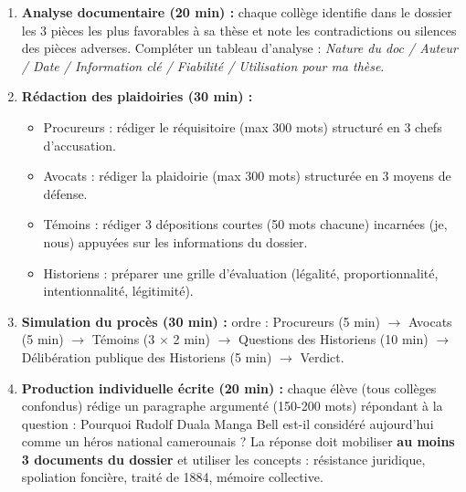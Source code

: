 \documentclass[11pt]{article}
\newcommand{\cle}[1]{{\popxbold\color{popdark}#1}}
\newcounter{popsec}
\newcounter{popsub}
\newcommand{\courssub}[1]{%
  \stepcounter{popsub}%
  \par\vspace{9pt}\noindent{\popxbold\fontsize{11.5}{13}\selectfont\color{popink}{\color{poporange}\thepopsec.\thepopsub}\hspace{6pt}#1}\par\nopagebreak\vspace{4pt}
}
\begin{document}
\courssub{Consignes}
\begin{enumerate}
    \item \textbf{Analyse documentaire (20 min) :} chaque collège identifie dans le dossier les 3 pièces les plus favorables à sa thèse et note les contradictions ou silences des pièces adverses. Compléter un tableau d'analyse : \emph{Nature du doc / Auteur / Date / Information clé / Fiabilité / Utilisation pour ma thèse}.
    \item \textbf{Rédaction des plaidoiries (30 min) :}
    \begin{itemize}
        \item Procureurs : rédiger le réquisitoire (max 300 mots) structuré en 3 chefs d'accusation.
        \item Avocats : rédiger la plaidoirie (max 300 mots) structurée en 3 moyens de défense.
        \item Témoins : rédiger 3 dépositions courtes (50 mots chacune) incarnées (je, nous) appuyées sur les informations du dossier.
        \item Historiens : préparer une grille d'évaluation (légalité, proportionnalité, intentionnalité, légitimité).
    \end{itemize}
    \item \textbf{Simulation du procès (30 min) :} ordre : Procureurs (5 min) $\to$ Avocats (5 min) $\to$ Témoins (3 $\times$ 2 min) $\to$ Questions des Historiens (10 min) $\to$ Délibération publique des Historiens (5 min) $\to$ Verdict.
    \item \textbf{Production individuelle écrite (20 min) :} chaque élève (tous collèges confondus) rédige un paragraphe argumenté (150-200 mots) répondant à la question : \og Pourquoi Rudolf Duala Manga Bell est-il considéré aujourd'hui comme un héros national camerounais ? \fg La réponse doit mobiliser \textbf{au moins 3 documents du dossier} et utiliser les concepts : \cle{résistance juridique}, \cle{spoliation foncière}, \cle{traité de 1884}, \cle{mémoire collective}.
\end{enumerate}
\end{document}

